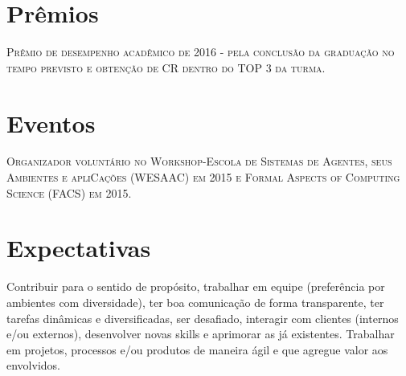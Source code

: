 \documentclass[a4paper,10pt]{article}
\begin{document}
\section {Prêmios}
\textsc{Prêmio de desempenho acadêmico de 2016 - pela conclusão da graduação no tempo previsto e obtenção de CR dentro do TOP 3 da turma.}

\section {Eventos}
\textsc{Organizador voluntário no Workshop-Escola de Sistemas de Agentes, seus Ambientes e apliCações (WESAAC) em 2015 e Formal Aspects of Computing Science (FACS) em 2015.}

\section {Expectativas}
Contribuir para o sentido de propósito, trabalhar em equipe (preferência por ambientes com diversidade), ter boa comunicação de forma transparente, ter tarefas dinâmicas e diversificadas, ser desafiado, interagir com clientes (internos e/ou externos), desenvolver novas skills e aprimorar as já existentes. Trabalhar em projetos, processos e/ou produtos de maneira ágil e que agregue valor aos envolvidos.
\end{document}

